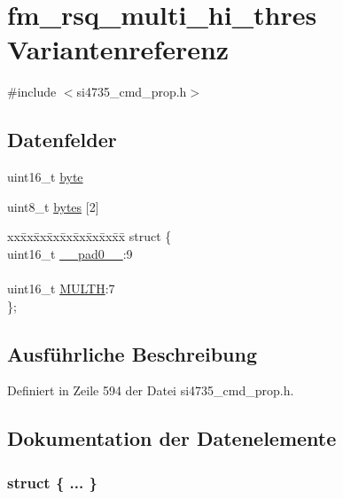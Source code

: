 \hypertarget{unionfm__rsq__multi__hi__thres}{}\section{fm\+\_\+rsq\+\_\+multi\+\_\+hi\+\_\+thres Variantenreferenz}
\label{unionfm__rsq__multi__hi__thres}


{\ttfamily \#include $<$si4735\+\_\+cmd\+\_\+prop.\+h$>$}

\subsection*{Datenfelder}
\begin{DoxyCompactItemize}
\item 
uint16\+\_\+t \hyperlink{unionfm__rsq__multi__hi__thres_ab0549c1b5ea980a02e7eab77e21fea49}{byte}
\item 
uint8\+\_\+t \hyperlink{unionfm__rsq__multi__hi__thres_a46e4c05d20a047ec169f60d3167e912e}{bytes} \mbox{[}2\mbox{]}
\item 
\begin{tabbing}
xx\=xx\=xx\=xx\=xx\=xx\=xx\=xx\=xx\=\kill
struct \{\\
\>uint16\_t \hyperlink{unionfm__rsq__multi__hi__thres_a77132c2c26a75f5b8751b235cda23828}{\_\_pad0\_\_}:9\\
\>\\
\>uint16\_t \hyperlink{unionfm__rsq__multi__hi__thres_ae82179b893ce2b80c7dda73e56b83972}{MULTH}:7\\
\}; \\

\end{tabbing}\end{DoxyCompactItemize}


\subsection{Ausführliche Beschreibung}


Definiert in Zeile 594 der Datei si4735\+\_\+cmd\+\_\+prop.\+h.



\subsection{Dokumentation der Datenelemente}
\hypertarget{unionfm__rsq__multi__hi__thres_a116cac1133f7d6c329135cd9fe78ec67}{}\subsubsection[{"@67}]{\setlength{\rightskip}{0pt plus 5cm}struct \{ ... \} }\label{unionfm__rsq__multi__hi__thres_a116cac1133f7d6c329135cd9fe78ec67}
\hypertarget{unionfm__rsq__multi__hi__thres_a77132c2c26a75f5b8751b235cda23828}{}
